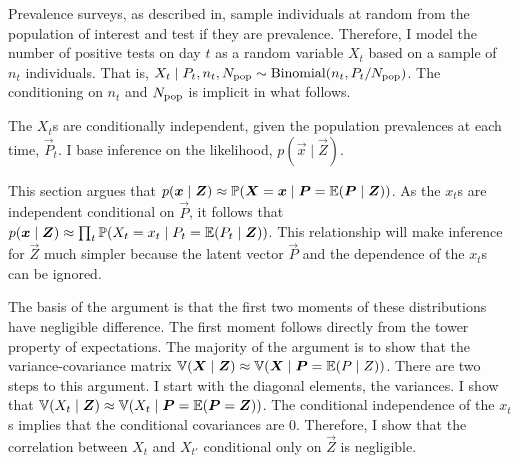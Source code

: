 \documentclass[thesis.tex]{subfiles}
\begin{document}
Prevalence surveys, as described in, sample individuals at random from the population of interest and test if they are prevalence.
Therefore, I model the number of positive tests on day $t$ as a random variable $X_t$ based on a sample of $n_t$ individuals.
That is, $X_t \mid P_t, n_t, N_\text{pop} \sim \operatorname{Binomial}(n_t, P_t/N_\text{pop})$.
The conditioning on $n_t$ and $N_\text{pop}$ is implicit in what follows.

The $X_t$s are conditionally independent, given the population prevalences at each time, $\vec{P}_t$. 
I base inference on the likelihood, $p(\vec{x} \mid \vec{Z})$.%

This section argues that $p(\bm{x} \mid \bm{Z}) \approx \operatorname{\mathbb{P}}(\bm{X} = \bm{x} \mid \bm{P} = \operatorname{\mathbb{E}}(\bm{P} \mid \bm{Z}))$.
As the $x_t$s are independent conditional on $\vec{P}$, it follows that $p(\bm{x} \mid \bm{Z}) \approx \prod_t \operatorname{\mathbb{P}}(X_t = x_t \mid P_t = \operatorname{\mathbb{E}}(P_t \mid \bm{Z}))$.
This relationship will make inference for $\vec{Z}$ much simpler because the latent vector $\vec{P}$ and the dependence of the $x_t$s can be ignored.

The basis of the argument is that the first two moments of these distributions have negligible difference.
The first moment follows directly from the tower property of expectations.
The majority of the argument is to show that the variance-covariance matrix $\operatorname{\mathbb{V}}(\bm{X} \mid \bm{Z}) \approx \operatorname{\mathbb{V}}(\bm{X} \mid \bm{P} = \operatorname{\mathbb{E}}(P \mid Z))$.
There are two steps to this argument.
I start with the diagonal elements, the variances.
I show that $\operatorname{\mathbb{V}}(X_t \mid \bm{Z}) \approx \operatorname{\mathbb{V}}(X_t \mid \bm{P} = \operatorname{\mathbb{E}}(\bm{P} = \bm{Z}))$.
The conditional independence of the $x_t$s implies that the conditional covariances are 0.
Therefore, I show that the correlation between $X_t$ and $X_{t'}$ conditional only on $\vec{Z}$ is negligible.
\end{document}
